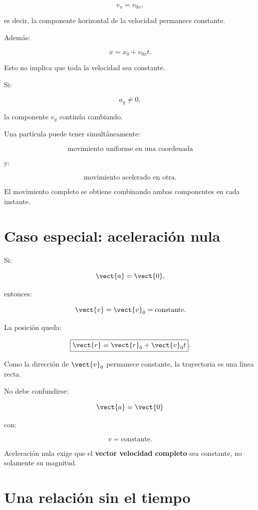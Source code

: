 \[
v_x=v_{0x},
\]

es decir, la componente horizontal de la velocidad permanece constante.

Además:

\[
x=x_0+v_{0x}t.
\]

Esto no implica que toda la velocidad sea constante.

Si:

\[
a_y\neq0,
\]

la componente \(v_y\) continúa cambiando.

\begin{interpretacion}
Una partícula puede tener simultáneamente:

\[
\text{movimiento uniforme en una coordenada}
\]

y:

\[
\text{movimiento acelerado en otra}.
\]

El movimiento completo se obtiene combinando ambas componentes en cada instante.
\end{interpretacion}


\section{Caso especial: aceleración nula}

Si:

\[
\vect{a}=\vect{0},
\]

entonces:

\[
\vect{v}=\vect{v}_0=\text{constante}.
\]

La posición queda:

\[
\boxed{
\vect{r}
=
\vect{r}_0+\vect{v}_0t
}.
\]

Como la dirección de \(\vect{v}_0\) permanece constante, la trayectoria es una
línea recta.

\begin{advertencia}
No debe confundirse:

\[
\vect{a}=\vect{0}
\]

con:

\[
v=\text{constante}.
\]

Aceleración nula exige que el \textbf{vector velocidad completo} sea constante,
no solamente su magnitud.
\end{advertencia}


\section{Una relación sin el tiempo}


